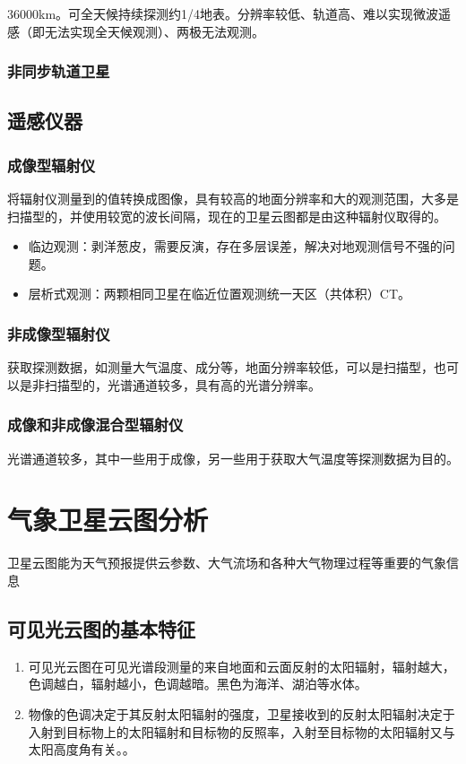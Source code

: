 \documentclass[UTF8,11pt]{ctexbook}
\begin{document}
36000km。可全天候持续探测约1/4地表。分辨率较低、轨道高、难以实现微波遥感（即无法实现全天候观测）、两极无法观测。

\subsubsection{非同步轨道卫星}


\subsection{遥感仪器}

\subsubsection{成像型辐射仪}

将辐射仪测量到的值转换成图像，具有较高的地面分辨率和大的观测范围，大多是扫描型的，并使用较宽的波长间隔，现在的卫星云图都是由这种辐射仪取得的。
\begin{itemize}
    \item 临边观测：剥洋葱皮，需要反演，存在多层误差，解决对地观测信号不强的问题。
    \item 层析式观测：两颗相同卫星在临近位置观测统一天区（共体积）CT。
\end{itemize}

\subsubsection{非成像型辐射仪}

获取探测数据，如测量大气温度、成分等，地面分辨率较低，可以是扫描型，也可以是非扫描型的，光谱通道较多，具有高的光谱分辨率。

\subsubsection{成像和非成像混合型辐射仪}

光谱通道较多，其中一些用于成像，另一些用于获取大气温度等探测数据为目的。

\section{气象卫星云图分析}

卫星云图能为天气预报提供云参数、大气流场和各种大气物理过程等重要的气象信息

\subsection{可见光云图的基本特征}
\begin{enumerate}
    \item 可见光云图在可见光谱段测量的来自地面和云面反射的太阳辐射，辐射越大，色调越白，辐射越小，色调越暗。黑色为海洋、湖泊等水体。
    \item 物像的色调决定于其反射太阳辐射的强度，卫星接收到的反射太阳辐射决定于入射到目标物上的太阳辐射和目标物的反照率，入射至目标物的太阳辐射又与太阳高度角有关。。
\end{enumerate}
\end{document}
